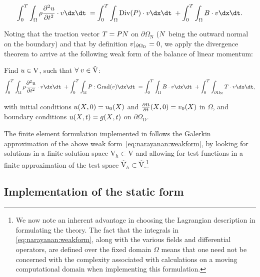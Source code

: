 \begin{equation}
 \int_{0}^{T} \int_{\Omega} \rho \frac{\partial^{2}
    \bu}{\partial t^{2}} \cdot \bv \dx \dt\;
  = \int_{0}^{T}\int_{\Omega} \mathrm{Div}(\bP) \cdot \bv \dx \dt\;
  + \int_{0}^{T} \int_{\Omega} \bB \cdot \bv \dx \dt.
\end{equation}

\noindent Noting that the traction vector $\mbox{$ T$} = \mbox{$ P$} \mbox{$ N$}$ on
$\partial\Omega_{\mathrm{N}}$ ($\mbox{$ N$}$ being the outward normal
on the boundary) and that by definition
$\mbox{$ v$}|_{\partial\Omega_{\mathrm{D}}} = 0$, we apply the divergence
theorem to arrive at the following weak form of the balance of linear
momentum:

\noindent Find $\mbox{$ u$} \in
\mathrm{V}$, such that $\forall\; \mbox{$ v$} \in \hat{\mathrm{V}}$:
\begin{equation}
  \int_{0}^{T} \int_{\Omega} \rho \frac{\partial^{2} \bu}{\partial
t^{2}} \cdot \bv \dx \dt\; + \int_{0}^{T} \int_{\Omega}
\bP:\mathrm{Grad}(\bv) \dx \dt\; = \int_{0}^{T} \int_{\Omega} \bB
\cdot \bv \dx \dt\; + \int_{0}^{T} \int_{\partial\Omega_{\mathrm{N}}}
\bT \cdot \bv \ds \dt,
\label{eq:narayanan:weakform}
\end{equation}

\noindent with initial conditions $\mbox{$ u$}(\mbox{$ X$}, 0) = \mbox{$ u$}_{0}(\mbox{$ X$})$ and
$\frac{\partial\mbox{$ u$}}{\partial t}(\mbox{$ X$}, 0) = \mbox{$ v$}_{0}(\mbox{$ X$})$ in
$\Omega$, and boundary conditions $\mbox{$ u$}(\mbox{$ X$}, t) = \mbox{$ g$}(\mbox{$ X$}, t)$ on
$\partial\Omega_{\mathrm{D}}$.

The finite element formulation implemented in \twist{} follows the
Galerkin approximation of the above weak
form~\eqref{eq:narayanan:weakform}, by looking for solutions in a finite
solution space  $\mathrm{V}_{h} \subset \mathrm{V}$ and allowing for
test functions in a finite approximation of the test space
$\hat{\mathrm{V}}_{h} \subset \hat{\mathrm{V}}$.\footnote{We now
  note an inherent advantage in choosing the Lagrangian description in
  formulating the theory. The fact that the integrals in
  \eqref{eq:narayanan:weakform}, along with the various fields
  and differential operators, are defined over the fixed domain
  $\Omega$ means that one need not be concerned with the
  complexity associated with calculations on a moving computational
  domain when implementing this formulation.}

\subsection{Implementation of the static form}

